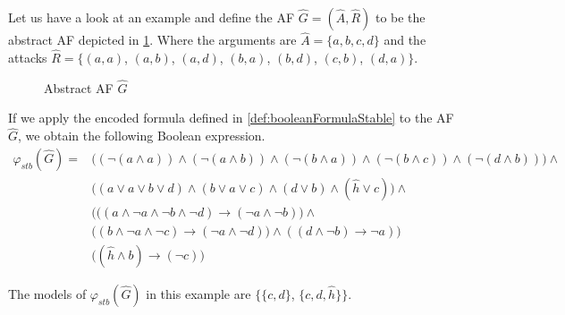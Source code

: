 \begin{example}
    Let us have a look at an example and define the AF $\hat{G}=(\hat{A}, \hat{R})$ to be the abstract AF depicted in \cref{af:algorithmEncodingsStable}. Where the arguments are $\hat{A}=\{a, b, c, d\}$ and the attacks $\hat{R}=\big\{ (a,a)$, $(a,b)$, $(a,d)$, $(b,a)$, $(b,d)$, $(c,b)$, $(d,a)\big\}$.

    \begin{figure}[H]
        \centering
        \caption{Abstract AF $\hat{G}$}
        \label{af:algorithmEncodingsStable}
    \end{figure}

If we apply the encoded formula defined in \cref{def:booleanFormulaStable} to the AF $\hat{G}$, we obtain the following Boolean expression.
\begin{align*}
    \varphi_{stb}(\hat{G}) = &\bigl( (\lnot (a \land a)) \land (\lnot (a \land b))
    \land (\lnot (b \land a)) \land (\lnot (b \land c)) \land (\lnot (d \land b)) \bigl) \land\\
    & \bigl( (a \lor a \lor b \lor d) \land (b \lor a \lor c) \land (d \lor b) \land (\hat{h} \lor c)\bigl) \land \\
    & \bigl( ((a \land \lnot a \land \lnot b \land \lnot d) \rightarrow (\lnot a \land \lnot b)\bigl) \land\\
    & \bigl((b \land \lnot a \land \lnot c) \rightarrow (\lnot a \land \lnot d)) \land ((d \land \lnot b) \rightarrow \lnot a)\bigl)\\
    & \bigl( (\hat{h} \land b) \rightarrow (\lnot c)\bigl)
\end{align*}


The models of $\varphi_{stb}(\hat{G})$ in this example are $\bigl\{$$\{c, d\}$, $\{c, d, \hat{h}\} \bigl\}$.
\end{example}

